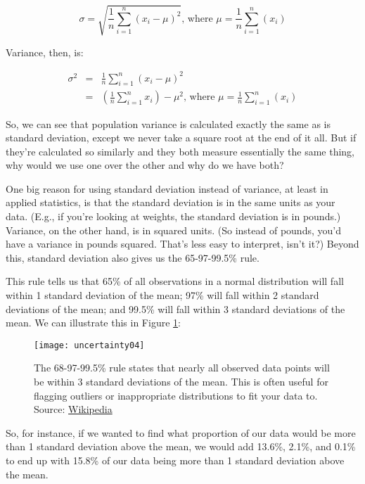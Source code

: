 \begin{equation*}
	\sigma = \sqrt{\frac{1}{n}\sum_{i=1}^n\left(x_i-\mu\right)^2}\text{, where } \mu=\frac{1}{n}\sum_{i=1}^n(x_i)
\end{equation*}

Variance, then, is:

\begin{eqnarray*}
	\sigma^2 &=& \frac{1}{n}\sum_{i=1}^n\left(x_i-\mu\right)^2 \\
	&=& \left(\frac{1}{n}\sum_{i=1}^nx_i\right)-\mu^2\text{, where } \mu=\frac{1}{n}\sum_{i=1}^n(x_i)
\end{eqnarray*}

So, we can see that population variance is calculated exactly the same as is standard deviation, except we never take a square root at the end of it all. But if they're calculated so similarly and they both measure essentially the same thing, why would we use one over the other and why do we have both?

One big reason for using standard deviation instead of variance, at least in applied statistics, is that the standard deviation is in the same units as your data. (E.g., if you're looking at weights, the standard deviation is in pounds.) Variance, on the other hand, is in squared units. (So instead of pounds, you'd have a variance in pounds squared. That's less easy to interpret, isn't it?) Beyond this, standard deviation also gives us the 65-97-99.5\% rule.

This rule tells us that 65\% of all observations in a normal distribution will fall within 1 standard deviation of the mean; 97\% will fall within 2 standard deviations of the mean; and 99.5\% will fall within 3 standard deviations of the mean. We can illustrate this in Figure \ref{fig:uncertainty04}:

\begin{figure}[h!]
\texttt{[image: uncertainty04]}
\caption{The 68-97-99.5\% rule states that nearly all observed data points will be within 3 standard deviations of the mean. This is often useful for flagging outliers or inappropriate distributions to fit your data to. Source: \href{http://en.wikipedia.org/wiki/Standard_deviation}{Wikipedia}}
\label{fig:uncertainty04}
\end{figure}

So, for instance, if we wanted to find what proportion of our data would be more than 1 standard deviation above the mean, we would add 13.6\%, 2.1\%, and 0.1\% to end up with 15.8\% of our data being more than 1 standard deviation above the mean.

